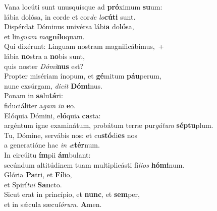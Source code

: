 \evenverse Vana locúti sunt unusquísque ad \textbf{pró}ximum \textbf{su}um:~\*\\
\evenverse lábia dolósa, in corde et cor\textit{de} \textit{lo}\textbf{cú}\textbf{ti} sunt.\\
\oddverse Dispérdat Dóminus univérsa lábi\textbf{a} do\textbf{ló}sa,~\*\\
\oddverse et lin\textit{guam} \textit{ma}\textbf{gní}\textbf{lo}quam.\\
\evenverse Qui dixérunt: Linguam nostram magnificábimus,~+\\
\evenverse  lábia \textbf{no}stra a \textbf{no}bis sunt,~\*\\
\evenverse quis noster \textit{Dó}\textit{mi}\textbf{nus} est?\\
\oddverse Propter misériam ínopum, et \textbf{gé}mitum \textbf{páu}perum,~\*\\
\oddverse nunc exsúrgam, \textit{di}\textit{cit} \textbf{Dó}\textbf{mi}nus.\\
\evenverse Ponam in \textbf{sa}lu\textbf{tá}ri:~\*\\
\evenverse fiduciáliter a\textit{gam} \textit{in} \textbf{e}o.\\
\oddverse Elóquia Dómini, e\textbf{ló}quia \textbf{ca}sta:~\*\\
\oddverse argéntum igne examinátum, probátum terræ pur\textit{gá}\textit{tum} \textbf{sép}\textbf{tu}plum.\\
\evenverse Tu, Dómine, servábis nos: et cu\textbf{stó}di\textbf{es} nos~\*\\
\evenverse a generatióne hac \textit{in} \textit{æ}\textbf{tér}num.\\
\oddverse In circúitu \textbf{ím}pii \textbf{ám}bulant:~\*\\
\oddverse secúndum altitúdinem tuam multiplicásti fí\textit{li}\textit{os} \textbf{hó}\textbf{mi}num.\\
\evenverse Glória \textbf{Pa}tri, et \textbf{Fí}lio,~\*\\
\evenverse et Spirí\textit{tu}\textit{i} \textbf{San}cto.\\
\oddverse Sicut erat in princípio, et \textbf{nunc}, et \textbf{sem}per,~\*\\
\oddverse et in sǽcula sæcu\textit{ló}\textit{rum}. \textbf{A}men.\\
